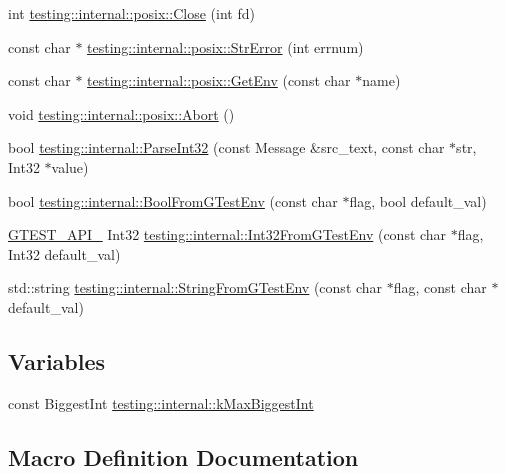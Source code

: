 \begin{DoxyCompactItemize}
\item 
int \hyperlink{namespacetesting_1_1internal_1_1posix_a15e5b8f2a535ef1b2529b85b861e4846}{testing\+::internal\+::posix\+::\+Close} (int fd)
\item 
const char $\ast$ \hyperlink{namespacetesting_1_1internal_1_1posix_a4b77b14af6f4d18f83d303b98e9349c4}{testing\+::internal\+::posix\+::\+Str\+Error} (int errnum)
\item 
const char $\ast$ \hyperlink{namespacetesting_1_1internal_1_1posix_a1d5e3da5a27eed25986859fa83cafe95}{testing\+::internal\+::posix\+::\+Get\+Env} (const char $\ast$name)
\item 
void \hyperlink{namespacetesting_1_1internal_1_1posix_a69b8278c59359dd6a6f941b4643db9fb}{testing\+::internal\+::posix\+::\+Abort} ()
\item 
bool \hyperlink{namespacetesting_1_1internal_ac06fc81336a3d80755f4020d34321766}{testing\+::internal\+::\+Parse\+Int32} (const Message \&src\+\_\+text, const char $\ast$str, Int32 $\ast$value)
\item 
bool \hyperlink{namespacetesting_1_1internal_a67132cdce23fb71b6c38ee34ef81eb4c}{testing\+::internal\+::\+Bool\+From\+G\+Test\+Env} (const char $\ast$flag, bool default\+\_\+val)
\item 
\hyperlink{gtest-port_8h_aa73be6f0ba4a7456180a94904ce17790}{G\+T\+E\+S\+T\+\_\+\+A\+P\+I\+\_\+} Int32 \hyperlink{namespacetesting_1_1internal_a0f7e728793f9e6cb0aa2b69eaa468bf3}{testing\+::internal\+::\+Int32\+From\+G\+Test\+Env} (const char $\ast$flag, Int32 default\+\_\+val)
\item 
std\+::string \hyperlink{namespacetesting_1_1internal_ac54dabc540bf79c2de91add679bfb93b}{testing\+::internal\+::\+String\+From\+G\+Test\+Env} (const char $\ast$flag, const char $\ast$default\+\_\+val)
\end{DoxyCompactItemize}
\subsection*{Variables}
\begin{DoxyCompactItemize}
\item 
const Biggest\+Int \hyperlink{namespacetesting_1_1internal_ad901880198832bc166d2493096b451f7}{testing\+::internal\+::k\+Max\+Biggest\+Int}
\end{DoxyCompactItemize}


\subsection{Macro Definition Documentation}
\mbox{\label{gtest-port_8h_a00b3684a621ce1422b55a0e7e8a6aecb}} 
